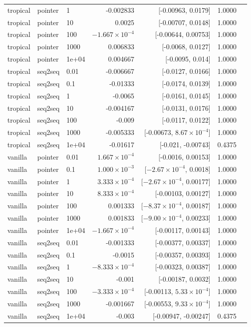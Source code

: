 \documentclass[10pt]{article}
\begin{document}
{\begin{longtable}{lllrrrl}
tropical & pointer & 1 & -0.002833 & [-0.00963, 0.0179] & 1.0000 & \\
tropical & pointer & 10 & 0.0025 & [-0.00707, 0.0148] & 1.0000 & \\
tropical & pointer & 100 & $-1.667\times10^{-4}$ & [-0.00644, 0.00753] & 1.0000 & \\
tropical & pointer & 1000 & 0.006833 & [-0.0068, 0.0127] & 1.0000 & \\
tropical & pointer & 1e+04 & 0.004667 & [-0.0095, 0.014] & 1.0000 & \\
tropical & seq2seq & 0.01 & -0.006667 & [-0.0127, 0.0166] & 1.0000 & \\
tropical & seq2seq & 0.1 & -0.01333 & [-0.0174, 0.0139] & 1.0000 & \\
tropical & seq2seq & 1 & -0.0065 & [-0.0161, 0.0145] & 1.0000 & \\
tropical & seq2seq & 10 & -0.004167 & [-0.0131, 0.0176] & 1.0000 & \\
tropical & seq2seq & 100 & -0.009 & [-0.0117, 0.0122] & 1.0000 & \\
tropical & seq2seq & 1000 & -0.005333 & [-0.00673, $8.67\times10^{-4}$] & 1.0000 & \\
tropical & seq2seq & 1e+04 & -0.01617 & [-0.021, -0.00743] & 0.4375 & \\
vanilla & pointer & 0.01 & $1.667\times10^{-4}$ & [-0.0016, 0.00153] & 1.0000 & \\
vanilla & pointer & 0.1 & $1.000\times10^{-3}$ & [$-2.67\times10^{-4}$, 0.0018] & 1.0000 & \\
vanilla & pointer & 1 & $3.333\times10^{-4}$ & [$-2.67\times10^{-4}$, 0.00177] & 1.0000 & \\
vanilla & pointer & 10 & $8.333\times10^{-4}$ & [-0.00103, 0.00127] & 1.0000 & \\
vanilla & pointer & 100 & 0.001333 & [$-8.37\times10^{-4}$, 0.00187] & 1.0000 & \\
vanilla & pointer & 1000 & 0.001833 & [$-9.00\times10^{-4}$, 0.00233] & 1.0000 & \\
vanilla & pointer & 1e+04 & $-1.667\times10^{-4}$ & [-0.00117, 0.00143] & 1.0000 & \\
vanilla & seq2seq & 0.01 & -0.001333 & [-0.00377, 0.00337] & 1.0000 & \\
vanilla & seq2seq & 0.1 & -0.0015 & [-0.00357, 0.00393] & 1.0000 & \\
vanilla & seq2seq & 1 & $-8.333\times10^{-4}$ & [-0.00323, 0.00387] & 1.0000 & \\
vanilla & seq2seq & 10 & -0.001 & [-0.00187, 0.0032] & 1.0000 & \\
vanilla & seq2seq & 100 & $-3.333\times10^{-4}$ & [-0.00113, $5.33\times10^{-4}$] & 1.0000 & \\
vanilla & seq2seq & 1000 & -0.001667 & [-0.00553, $9.33\times10^{-4}$] & 1.0000 & \\
vanilla & seq2seq & 1e+04 & -0.003 & [-0.00947, -0.00247] & 0.4375 & \\
\bottomrule
\end{longtable}
}
\end{document}
